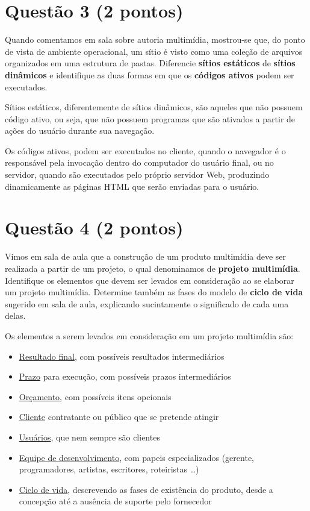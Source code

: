 \documentclass[a4paper,11pt]{article}
\begin{document}
\section*{Questão 3 (2 pontos)}
Quando comentamos em sala sobre autoria multimídia, mostrou-se que, do ponto de
vista de ambiente operacional, um sítio é visto como uma coleção de arquivos
organizados em uma estrutura de pastas. Diferencie {\bf sítios estáticos} de
{\bf sítios dinâmicos} e identifique as duas formas em que os {\bf códigos
ativos} podem ser executados.

\vspace{0.25cm}

Sítios estáticos, diferentemente de sítios dinâmicos, são aqueles que não
possuem código ativo, ou seja, que não possuem programas que são ativados a
partir de ações do usuário durante sua navegação. 

Os códigos ativos, podem ser executados no cliente, quando o navegador é o
responsável pela invocação dentro do computador do usuário final, ou no
servidor, quando são executados pelo próprio servidor Web, produzindo
dinamicamente as páginas HTML que serão enviadas para o usuário.
    
\pagebreak

\section*{Questão 4 (2 pontos)}
Vimos em sala de aula que a construção de um produto multimídia deve ser
realizada a partir de um projeto, o qual denominamos de {\bf projeto
multimídia}. Identifique os elementos que devem ser levados em consideração ao
se elaborar um projeto multimídia. Determine também as fases do modelo de {\bf
ciclo de vida} sugerido em sala de aula, explicando sucintamente o significado
de cada uma delas.

\vspace{0.25cm}

Os elementos a serem levados em consideração em um projeto multimídia são:

\begin{itemize}
    \item \uline{Resultado final}, com possíveis resultados intermediários
    \item \uline{Prazo} para execução, com possíveis prazos intermediários
    \item \uline{Orçamento}, com possíveis itens opcionais
    \item \uline{Cliente} contratante ou público que se pretende atingir
    \item \uline{Usuários}, que nem sempre são clientes
    \item \uline{Equipe de desenvolvimento}, com papeis especializados (gerente,
programadores, artistas, escritores, roteiristas \ldots)
    \item \uline{Ciclo de vida}, descrevendo as fases de existência do produto,
desde a concepção até a ausência de suporte pelo fornecedor
\end{itemize}
\end{document}
